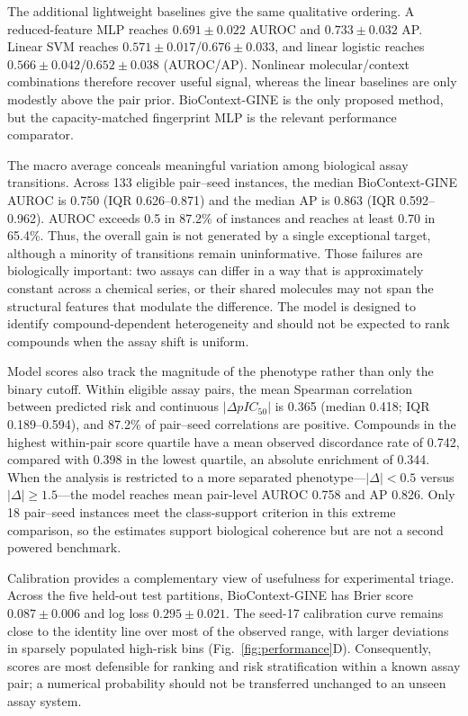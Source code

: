\documentclass[letterpaper]{article}
\begin{document}
The additional lightweight baselines give the same qualitative ordering. A reduced-feature MLP reaches $0.691\pm0.022$ AUROC and $0.733\pm0.032$ AP. Linear SVM reaches $0.571\pm0.017$/$0.676\pm0.033$, and linear logistic reaches $0.566\pm0.042$/$0.652\pm0.038$ (AUROC/AP). Nonlinear molecular/context combinations therefore recover useful signal, whereas the linear baselines are only modestly above the pair prior. BioContext-GINE is the only proposed method, but the capacity-matched fingerprint MLP is the relevant performance comparator.

The macro average conceals meaningful variation among biological assay transitions. Across 133 eligible pair--seed instances, the median BioContext-GINE AUROC is 0.750 (IQR 0.626--0.871) and the median AP is 0.863 (IQR 0.592--0.962). AUROC exceeds 0.5 in 87.2\% of instances and reaches at least 0.70 in 65.4\%. Thus, the overall gain is not generated by a single exceptional target, although a minority of transitions remain uninformative. Those failures are biologically important: two assays can differ in a way that is approximately constant across a chemical series, or their shared molecules may not span the structural features that modulate the difference. The model is designed to identify compound-dependent heterogeneity and should not be expected to rank compounds when the assay shift is uniform.

Model scores also track the magnitude of the phenotype rather than only the binary cutoff. Within eligible assay pairs, the mean Spearman correlation between predicted risk and continuous $|\Delta pIC_{50}|$ is 0.365 (median 0.418; IQR 0.189--0.594), and 87.2\% of pair--seed correlations are positive. Compounds in the highest within-pair score quartile have a mean observed discordance rate of 0.742, compared with 0.398 in the lowest quartile, an absolute enrichment of 0.344. When the analysis is restricted to a more separated phenotype---$|\Delta|<0.5$ versus $|\Delta|\geq1.5$---the model reaches mean pair-level AUROC 0.758 and AP 0.826. Only 18 pair--seed instances meet the class-support criterion in this extreme comparison, so the estimates support biological coherence but are not a second powered benchmark.

Calibration provides a complementary view of usefulness for experimental triage. Across the five held-out test partitions, BioContext-GINE has Brier score $0.087\pm0.006$ and log loss $0.295\pm0.021$. The seed-17 calibration curve remains close to the identity line over most of the observed range, with larger deviations in sparsely populated high-risk bins (Fig.~\ref{fig:performance}D). Consequently, scores are most defensible for ranking and risk stratification within a known assay pair; a numerical probability should not be transferred unchanged to an unseen assay system.
\end{document}
